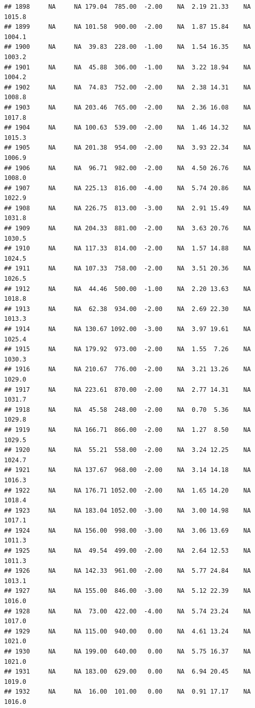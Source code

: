 \documentclass{article}\usepackage{graphicx, color}
\makeatletter
\newenvironment{kframe}{%
 \def\at@end@of@kframe{}%
 \ifinner\ifhmode%
  \def\at@end@of@kframe{\end{minipage}}%
  \begin{minipage}{\columnwidth}%
 \fi\fi%
 \def\FrameCommand##1{\hskip\@totalleftmargin \hskip-\fboxsep
 \colorbox{shadecolor}{##1}\hskip-\fboxsep
     \hskip-\linewidth \hskip-\@totalleftmargin \hskip\columnwidth}%
 \MakeFramed {\advance\hsize-\width
   \@totalleftmargin\z@ \linewidth\hsize
   \@setminipage}}%
 {\par\unskip\endMakeFramed%
 \at@end@of@kframe}
\newenvironment{knitrout}{}{} %
\makeatother
\begin{document}
\begin{knitrout}
\begin{kframe}
\begin{verbatim}
## 1898     NA     NA 179.04  785.00  -2.00    NA  2.19 21.33    NA 1015.8
## 1899     NA     NA 101.58  900.00  -2.00    NA  1.87 15.84    NA 1004.1
## 1900     NA     NA  39.83  228.00  -1.00    NA  1.54 16.35    NA 1003.2
## 1901     NA     NA  45.88  306.00  -1.00    NA  3.22 18.94    NA 1004.2
## 1902     NA     NA  74.83  752.00  -2.00    NA  2.38 14.31    NA 1008.8
## 1903     NA     NA 203.46  765.00  -2.00    NA  2.36 16.08    NA 1017.8
## 1904     NA     NA 100.63  539.00  -2.00    NA  1.46 14.32    NA 1015.3
## 1905     NA     NA 201.38  954.00  -2.00    NA  3.93 22.34    NA 1006.9
## 1906     NA     NA  96.71  982.00  -2.00    NA  4.50 26.76    NA 1008.0
## 1907     NA     NA 225.13  816.00  -4.00    NA  5.74 20.86    NA 1022.9
## 1908     NA     NA 226.75  813.00  -3.00    NA  2.91 15.49    NA 1031.8
## 1909     NA     NA 204.33  881.00  -2.00    NA  3.63 20.76    NA 1030.5
## 1910     NA     NA 117.33  814.00  -2.00    NA  1.57 14.88    NA 1024.5
## 1911     NA     NA 107.33  758.00  -2.00    NA  3.51 20.36    NA 1026.5
## 1912     NA     NA  44.46  500.00  -1.00    NA  2.20 13.63    NA 1018.8
## 1913     NA     NA  62.38  934.00  -2.00    NA  2.69 22.30    NA 1013.3
## 1914     NA     NA 130.67 1092.00  -3.00    NA  3.97 19.61    NA 1025.4
## 1915     NA     NA 179.92  973.00  -2.00    NA  1.55  7.26    NA 1030.3
## 1916     NA     NA 210.67  776.00  -2.00    NA  3.21 13.26    NA 1029.0
## 1917     NA     NA 223.61  870.00  -2.00    NA  2.77 14.31    NA 1031.7
## 1918     NA     NA  45.58  248.00  -2.00    NA  0.70  5.36    NA 1029.8
## 1919     NA     NA 166.71  866.00  -2.00    NA  1.27  8.50    NA 1029.5
## 1920     NA     NA  55.21  558.00  -2.00    NA  3.24 12.25    NA 1024.7
## 1921     NA     NA 137.67  968.00  -2.00    NA  3.14 14.18    NA 1016.3
## 1922     NA     NA 176.71 1052.00  -2.00    NA  1.65 14.20    NA 1018.4
## 1923     NA     NA 183.04 1052.00  -3.00    NA  3.00 14.98    NA 1017.1
## 1924     NA     NA 156.00  998.00  -3.00    NA  3.06 13.69    NA 1011.3
## 1925     NA     NA  49.54  499.00  -2.00    NA  2.64 12.53    NA 1011.3
## 1926     NA     NA 142.33  961.00  -2.00    NA  5.77 24.84    NA 1013.1
## 1927     NA     NA 155.00  846.00  -3.00    NA  5.12 22.39    NA 1016.0
## 1928     NA     NA  73.00  422.00  -4.00    NA  5.74 23.24    NA 1017.0
## 1929     NA     NA 115.00  940.00   0.00    NA  4.61 13.24    NA 1021.0
## 1930     NA     NA 199.00  640.00   0.00    NA  5.75 16.37    NA 1021.0
## 1931     NA     NA 183.00  629.00   0.00    NA  6.94 20.45    NA 1019.0
## 1932     NA     NA  16.00  101.00   0.00    NA  0.91 17.17    NA 1016.0

\end{verbatim}
\end{kframe}
\end{knitrout}
\end{document}
